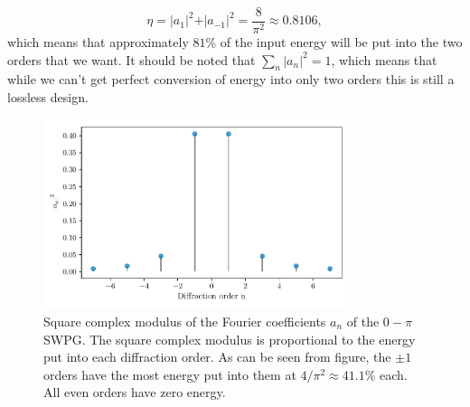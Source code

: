 \begin{equation}
	\eta=\rvert a_1\rvert^2 + \rvert a_{-1}\rvert^2 =\frac{8}{\pi^2}\approx 0.8106,
\end{equation} 
which means that approximately $81\%$ of the input energy will be put into the two orders that we want.  It should be noted that $\sum_{n}\rvert a_n\rvert^2=1$, which means that while we can't get perfect conversion of energy into only two orders this is still a lossless design.
\begin{figure}
	\centering
	\includegraphics[width=0.8\textwidth]{figures/Two_source/a_n.pdf}
	\caption{Square complex modulus of the Fourier coefficients $a_n$ of the $0-\pi$ SWPG. The square complex modulus is proportional to the energy put into each diffraction order.  As can be seen from figure, the $\pm1$ orders have the most energy put into them at $4/\pi^2\approx41.1\%$ each.  All even orders have zero energy.}
	\label{fig:a_n}
\end{figure}

